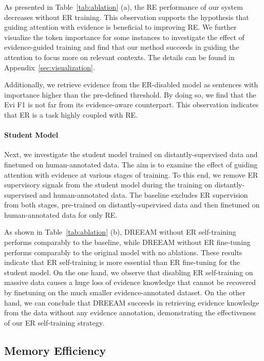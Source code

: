 \documentclass[11pt]{article}
\begin{document}
As presented in Table~\ref{tab:ablation} (a), the RE performance of our system decreases without ER training.
This observation supports the hypothesis that guiding attention with evidence is beneficial to improving RE.
We further visualize the token importance  for some instances to investigate the effect of evidence-guided training and find that our method succeeds in guiding the attention to focus more on relevant contexts.
The details can be found in Appendix~\ref{sec:visualization}.

Additionally, we retrieve evidence from the ER-disabled model as sentences with importance higher than the pre-defined threshold.
By doing so, we find that the Evi F1 is not far from its evidence-aware counterpart.
This observation indicates that ER is a task highly coupled with RE.

\paragraph{Student Model} Next, we investigate the student model trained on distantly-supervised data and finetuned on human-annotated data.
The aim is to examine the effect of guiding attention with evidence at various stages of training.
To this end, we remove ER supervisory signals from the student model during the training on distantly-supervised and human-annotated data.
The baseline excludes ER supervision from both stages, pre-trained on distantly-supervised data and then finetuned on human-annotated data for only RE.

As shown in Table~\ref{tab:ablation} (b), DREEAM without ER self-training performs comparably to the baseline, while DREEAM without ER fine-tuning performs comparably to the original model with no ablations.
These results indicate that ER self-training is more essential than ER fine-tuning for the student model.
On the one hand, we observe that disabling ER self-training on massive data causes a huge loss of evidence knowledge that cannot be recovered by finetuning on the much smaller evidence-annotated dataset.
On the other hand, we can conclude that DREEAM succeeds in retrieving evidence knowledge from the data without any evidence annotation, demonstrating the effectiveness of our ER self-training strategy.




\subsection{Memory Efficiency}
\end{document}
